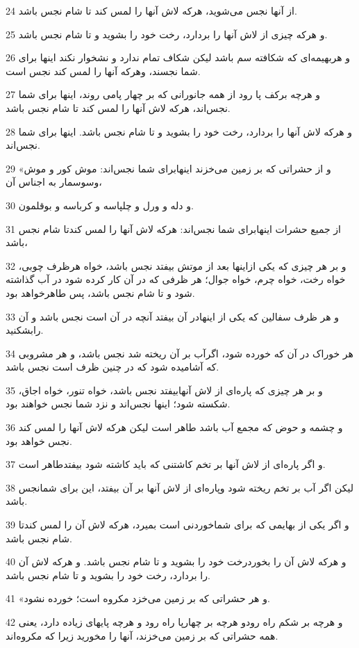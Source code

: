 \par 24 از آنها نجس می‌شوید، هرکه لاش آنها را لمس کند تا شام نجس باشد.
\par 25 و هر‌که چیزی از لاش آنها را بردارد، رخت خود را بشوید و تا شام نجس باشد.
\par 26 و هربهیمه‌ای که شکافته سم باشد لیکن شکاف تمام ندارد و نشخوار نکند اینها برای شما نجسند، وهر‌که آنها را لمس کند نجس است.
\par 27 و هر‌چه برکف پا رود از همه جانورانی که بر چهار پامی روند، اینها برای شما نجس‌اند، هر‌که لاش آنها را لمس کند تا شام نجس باشد.
\par 28 و هر‌که لاش آنها را بردارد، رخت خود را بشوید و تا شام نجس باشد. اینها برای شما نجس‌اند.
\par 29 «و از حشراتی که بر زمین می‌خزند اینهابرای شما نجس‌اند: موش کور و موش وسوسمار به اجناس آن،
\par 30 و دله و ورل و چلپاسه و کرباسه و بوقلمون.
\par 31 از جمیع حشرات اینهابرای شما نجس‌اند: هر‌که لاش آنها را لمس کندتا شام نجس باشد،
\par 32 و بر هر چیزی که یکی ازاینها بعد از موتش بیفتد نجس باشد، خواه هرظرف چوبی، خواه رخت، خواه چرم، خواه جوال؛ هر ظرفی که در آن کار کرده شود در آب گذاشته شود و تا شام نجس باشد، پس طاهرخواهد بود.
\par 33 و هر ظرف سفالین که یکی از اینهادر آن بیفتد آنچه در آن است نجس باشد و آن رابشکنید.
\par 34 هر خوراک در آن که خورده شود، اگرآب بر آن ریخته شد نجس باشد، و هر مشروبی که آشامیده شود که در چنین ظرف است نجس باشد.
\par 35 و بر هر چیزی که پاره‌ای از لاش آنهابیفتد نجس باشد، خواه تنور، خواه اجاق، شکسته شود؛ اینها نجس‌اند و نزد شما نجس خواهند بود.
\par 36 و چشمه و حوض که مجمع آب باشد طاهر است لیکن هر‌که لاش آنها را لمس کند نجس خواهد بود.
\par 37 و اگر پاره‌ای از لاش آنها بر تخم کاشتنی که باید کاشته شود بیفتدطاهر است.
\par 38 لیکن اگر آب بر تخم ریخته شود وپاره‌ای از لاش آنها بر آن بیفتد، این برای شمانجس باشد.
\par 39 و اگر یکی از بهایمی که برای شماخوردنی است بمیرد، هر‌که لاش آن را لمس کندتا شام نجس باشد.
\par 40 و هر‌که لاش آن را بخوردرخت خود را بشوید و تا شام نجس باشد. و هر‌که لاش آن را بردارد، رخت خود را بشوید و تا شام نجس باشد.
\par 41 «و هر حشراتی که بر زمین می‌خزد مکروه است؛ خورده نشود.
\par 42 و هر‌چه بر شکم راه رودو هر‌چه بر چهارپا راه رود و هر‌چه پایهای زیاده دارد، یعنی همه حشراتی که بر زمین می‌خزند، آنها را مخورید زیرا که مکروه‌اند.
